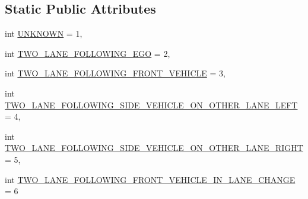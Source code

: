 \subsection*{Static Public Attributes}
\begin{DoxyCompactItemize}
\item 
int \hyperlink{classimplementation_1_1actor__situation__class__detection_1_1bayesian__network__id__selection_1_c01f1dacd43bed2d1110fc7cec61e664_a86a7fd55d6332f550538eae8fec3303a}{U\+N\+K\+N\+O\+WN} = 1,
\item 
int \hyperlink{classimplementation_1_1actor__situation__class__detection_1_1bayesian__network__id__selection_1_c01f1dacd43bed2d1110fc7cec61e664_a663104f7c0b4e8e9292e345994df3e8a}{T\+W\+O\+\_\+\+L\+A\+N\+E\+\_\+\+F\+O\+L\+L\+O\+W\+I\+N\+G\+\_\+\+E\+GO} = 2,
\item 
int \hyperlink{classimplementation_1_1actor__situation__class__detection_1_1bayesian__network__id__selection_1_c01f1dacd43bed2d1110fc7cec61e664_ae8a24c9833e1a84925277af449b4b2e2}{T\+W\+O\+\_\+\+L\+A\+N\+E\+\_\+\+F\+O\+L\+L\+O\+W\+I\+N\+G\+\_\+\+F\+R\+O\+N\+T\+\_\+\+V\+E\+H\+I\+C\+LE} = 3,
\item 
int \hyperlink{classimplementation_1_1actor__situation__class__detection_1_1bayesian__network__id__selection_1_c01f1dacd43bed2d1110fc7cec61e664_a80f21fbae9c3cfb9a17be8d96b9a2f2f}{T\+W\+O\+\_\+\+L\+A\+N\+E\+\_\+\+F\+O\+L\+L\+O\+W\+I\+N\+G\+\_\+\+S\+I\+D\+E\+\_\+\+V\+E\+H\+I\+C\+L\+E\+\_\+\+O\+N\+\_\+\+O\+T\+H\+E\+R\+\_\+\+L\+A\+N\+E\+\_\+\+L\+E\+FT} = 4,
\item 
int \hyperlink{classimplementation_1_1actor__situation__class__detection_1_1bayesian__network__id__selection_1_c01f1dacd43bed2d1110fc7cec61e664_ae4769da71090da6b10c9b68aa126efd2}{T\+W\+O\+\_\+\+L\+A\+N\+E\+\_\+\+F\+O\+L\+L\+O\+W\+I\+N\+G\+\_\+\+S\+I\+D\+E\+\_\+\+V\+E\+H\+I\+C\+L\+E\+\_\+\+O\+N\+\_\+\+O\+T\+H\+E\+R\+\_\+\+L\+A\+N\+E\+\_\+\+R\+I\+G\+HT} = 5,
\item 
int \hyperlink{classimplementation_1_1actor__situation__class__detection_1_1bayesian__network__id__selection_1_c01f1dacd43bed2d1110fc7cec61e664_a59f39091615e7ed03d13909bc9b663d3}{T\+W\+O\+\_\+\+L\+A\+N\+E\+\_\+\+F\+O\+L\+L\+O\+W\+I\+N\+G\+\_\+\+F\+R\+O\+N\+T\+\_\+\+V\+E\+H\+I\+C\+L\+E\+\_\+\+I\+N\+\_\+\+L\+A\+N\+E\+\_\+\+C\+H\+A\+N\+GE} = 6
\end{DoxyCompactItemize}


